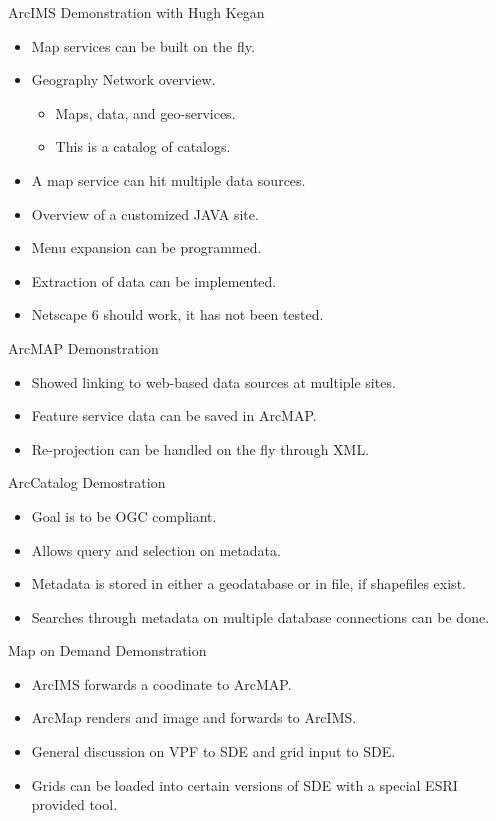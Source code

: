 ArcIMS Demonstration with Hugh Kegan

\begin{itemize}
\item Map services can be built on the fly.
\item Geography Network overview.
\begin{itemize}
\item Maps, data, and geo-services.
\item This is a catalog of catalogs.
\end{itemize}
\item A map service can hit multiple data sources.
\item Overview of a customized JAVA site.
\item Menu expansion can be programmed.
\item Extraction of data can be implemented.
\item Netscape 6 should work, it has not been tested.
\end{itemize}


ArcMAP Demonstration

\begin{itemize}
\item Showed linking to web-based data sources at multiple sites.
\item Feature service data can be saved in ArcMAP.
\item Re-projection can be handled on the fly through XML.
\end{itemize}





ArcCatalog Demostration

\begin{itemize}
\item Goal is to be OGC compliant.
\item Allows query and selection on metadata.
\item Metadata is stored in either a geodatabase or in file, if shapefiles exist.
\item Searches through metadata on multiple database connections can be done.
\end{itemize}


Map on Demand Demonstration

\begin{itemize}
\item ArcIMS forwards a coodinate to ArcMAP.
\item ArcMap renders and image and forwards to ArcIMS.
\item General discussion on VPF to SDE and grid input to SDE.
\item Grids can be loaded into certain versions of SDE with a special ESRI provided tool.
\end{itemize}

